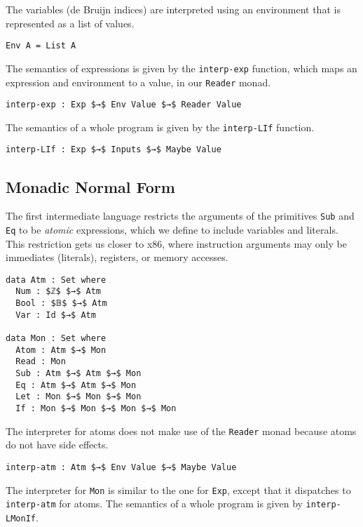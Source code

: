 \documentclass[sigplan,review,dvipsnames,screen,10pt]{acmart}
\begin{document}
\noindent The variables (de Bruijn indices) are interpreted using an
environment that is represented as a list of values.

\begin{lstlisting}
Env A = List A
\end{lstlisting}

\noindent The semantics of expressions is given by the
\lstinline{interp-exp} function, which maps an expression and
environment to a value, in our \lstinline{Reader} monad.

\begin{lstlisting}
interp-exp : Exp $→$ Env Value $→$ Reader Value
\end{lstlisting}

\noindent The semantics of a whole program is given by the
\lstinline{interp-LIf} function.

\begin{lstlisting}
interp-LIf : Exp $→$ Inputs $→$ Maybe Value
\end{lstlisting}

\subsection{Monadic Normal Form}

The first intermediate language restricts the arguments of the
primitives \lstinline{Sub} and \lstinline{Eq} to be \emph{atomic}
expressions, which we define to include variables and literals. This
restriction gets us closer to x86, where instruction arguments may
only be immediates (literals), registers, or memory accesses.

\begin{lstlisting}
data Atm : Set where
  Num : $ℤ$ $→$ Atm 
  Bool : $𝔹$ $→$ Atm 
  Var : Id $→$ Atm

data Mon : Set where
  Atom : Atm $→$ Mon
  Read : Mon
  Sub : Atm $→$ Atm $→$ Mon
  Eq : Atm $→$ Atm $→$ Mon
  Let : Mon $→$ Mon $→$ Mon
  If : Mon $→$ Mon $→$ Mon $→$ Mon
\end{lstlisting}

The interpreter for atoms does not make use of the \lstinline{Reader}
monad because atoms do not have side effects.

\begin{lstlisting}
interp-atm : Atm $→$ Env Value $→$ Maybe Value
\end{lstlisting}

The interpreter for \lstinline{Mon} is similar to the
one for \lstinline{Exp}, except that it dispatches
to \lstinline{interp-atm} for atoms. The semantics
of a whole program is given by \lstinline{interp-LMonIf}.
\end{document}
